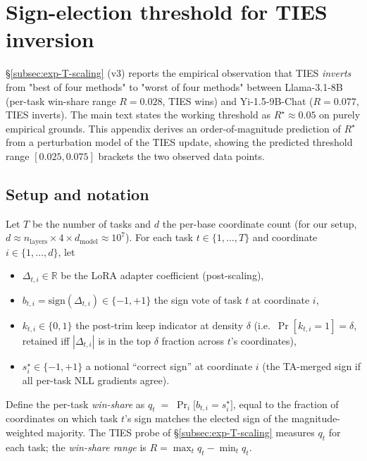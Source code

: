 %

\section{Sign-election threshold for TIES inversion}
\label{app:sign-election-threshold}

\S\ref{subsec:exp-T-scaling} (v3) reports the empirical observation that
TIES \emph{inverts} from "best of four methods" to "worst of four
methods" between Llama-3.1-8B (per-task win-share range $R = 0.028$,
TIES wins) and Yi-1.5-9B-Chat ($R = 0.077$, TIES inverts). The main
text states the working threshold as $R^\star \approx 0.05$ on purely
empirical grounds. This appendix derives an order-of-magnitude
prediction of $R^\star$ from a perturbation model of the TIES update,
showing the predicted threshold range $[0.025, 0.075]$ brackets the two
observed data points.

\subsection{Setup and notation}
\label{app:td2-setup}

Let $T$ be the number of tasks and $d$ the per-base coordinate count
(for our setup, $d \approx n_{\mathrm{layers}} \times 4 \times
d_{\mathrm{model}} \approx 10^7$). For each task $t \in \{1, \dots, T\}$
and coordinate $i \in \{1, \dots, d\}$, let
\begin{itemize}
\item $\Delta_{t,i} \in \mathbb{R}$ be the LoRA adapter coefficient
  (post-scaling),
\item $b_{t,i} = \mathrm{sign}(\Delta_{t,i}) \in \{-1, +1\}$ the sign
  vote of task $t$ at coordinate $i$,
\item $k_{t,i} \in \{0, 1\}$ the post-trim keep indicator at density
  $\delta$ (i.e.\ $\Pr[k_{t,i} = 1] = \delta$, retained iff
  $|\Delta_{t,i}|$ is in the top $\delta$ fraction across $t$'s
  coordinates),
\item $s_i^\star \in \{-1, +1\}$ a notional ``correct sign'' at
  coordinate $i$ (the TA-merged sign if all per-task NLL gradients agree).
\end{itemize}
Define the per-task \emph{win-share} as
$q_t \;=\; \Pr_i\!\big[b_{t,i} = s_i^\star\big]$, equal to the
fraction of coordinates on which task $t$'s sign matches the elected
sign of the magnitude-weighted majority. The TIES probe of
\S\ref{subsec:exp-T-scaling} measures $q_t$ for each task; the
\emph{win-share range} is $R = \max_t q_t - \min_t q_t$.


